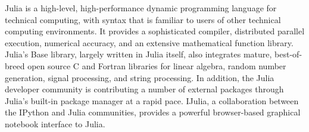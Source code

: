 Julia is a high-level, high-performance dynamic programming language for technical computing, with syntax that is familiar to users of
other technical computing environments. It provides a sophisticated compiler, distributed parallel execution, numerical accuracy, and an
extensive mathematical function library. Julia’s Base library, largely written in Julia itself, also integrates mature, best-of-breed 
open source C and Fortran libraries for linear algebra, random number generation, signal processing, and string processing. In addition, 
the Julia developer community is contributing a number of external packages through Julia’s built-in package manager at a rapid pace. 
IJulia, a collaboration between the IPython and Julia communities, provides a powerful browser-based graphical notebook interface to Julia.
